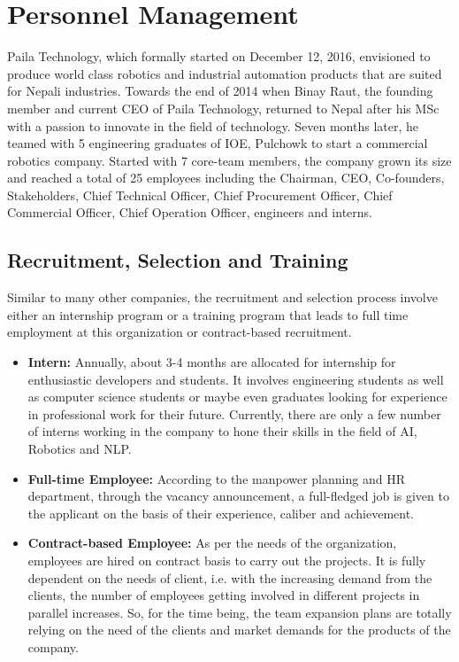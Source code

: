\documentclass[12pt,a4paper]{scrreprt}
\begin{document}
\chapter{Personnel Management}
Paila Technology, which formally started on December 12, 2016, envisioned to produce world class robotics and industrial automation products that are suited for Nepali industries. Towards the end of 2014 when Binay Raut, the founding member and current CEO of Paila Technology, returned to Nepal after his MSc with a passion to innovate in the field of technology. Seven months later, he teamed with 5 engineering graduates of IOE, Pulchowk to start a commercial robotics company. Started with 7 core-team members, the company grown its size and reached a total of 25 employees including the Chairman, CEO, Co-founders, Stakeholders, Chief Technical Officer, Chief Procurement Officer, Chief Commercial Officer, Chief Operation Officer, engineers and interns.
\section{Recruitment, Selection and Training}
Similar to many other companies, the recruitment and selection process involve either an internship program or a training program that leads to full time employment at this organization or contract-based recruitment.
	\begin{itemize}
		\item \textbf{Intern:} Annually, about 3-4 months are allocated for internship for enthusiastic developers and students. It involves engineering students as well as computer science students or maybe even graduates looking for experience in professional work for their future. Currently, there are only a few number of interns working in the company to hone their skills in the field of AI, Robotics and NLP.
		\item \textbf{Full-time Employee:} According to the manpower planning and HR department, through the vacancy announcement, a full-fledged job is given to the applicant on the basis of their experience, caliber and achievement.
		\item \textbf{Contract-based Employee:} As per the needs of the organization, employees are hired on contract basis to carry out the projects. It is fully dependent on the needs of client, i.e. with the increasing demand from the clients, the number of employees getting involved in different projects in parallel increases. So, for the time being, the team expansion plans are totally relying on the need of the clients and market demands for the products of the company.
	\end{itemize}
	
\end{document}

